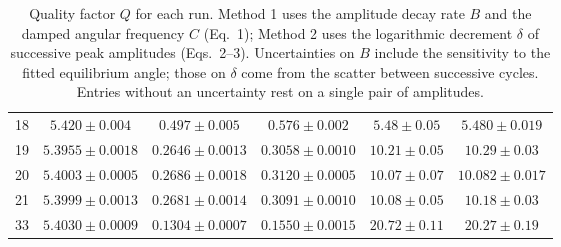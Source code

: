\begin{table}[h]
\begin{tabular}{c c c c c c}
18 & $5.420 \pm 0.004$ & $0.497 \pm 0.005$ & $0.576 \pm 0.002$ & $5.48 \pm 0.05$ & $5.480 \pm 0.019$ \\
19 & $5.3955 \pm 0.0018$ & $0.2646 \pm 0.0013$ & $0.3058 \pm 0.0010$ & $10.21 \pm 0.05$ & $10.29 \pm 0.03$ \\
20 & $5.4003 \pm 0.0005$ & $0.2686 \pm 0.0018$ & $0.3120 \pm 0.0005$ & $10.07 \pm 0.07$ & $10.082 \pm 0.017$ \\
21 & $5.3999 \pm 0.0013$ & $0.2681 \pm 0.0014$ & $0.3091 \pm 0.0010$ & $10.08 \pm 0.05$ & $10.18 \pm 0.03$ \\
33 & $5.4030 \pm 0.0009$ & $0.1304 \pm 0.0007$ & $0.1550 \pm 0.0015$ & $20.72 \pm 0.11$ & $20.27 \pm 0.19$ \\
\bottomrule
\end{tabular}
\caption{Quality factor $Q$ for each run. Method 1 uses the amplitude decay rate $B$ and the damped angular frequency $C$ (Eq.~1); Method 2 uses the logarithmic decrement $\delta$ of successive peak amplitudes (Eqs.~2--3). Uncertainties on $B$ include the sensitivity to the fitted equilibrium angle; those on $\delta$ come from the scatter between successive cycles. Entries without an uncertainty rest on a single pair of amplitudes.}
\label{tab:Q}
\end{table}